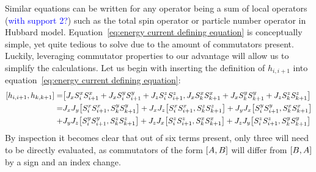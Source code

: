 Similar equations can be written for any operator being a sum of local operators (\textcolor{blue}{with support 2?}) such as
the total spin operator or particle number operator in Hubbard model. Equation~\eqref{eq:energy current defining equation} is
conceptually simple, yet quite tedious to solve due to the amount of commutators present. Luckily, leveraging commutator properties
to our advantage will allow us to simplify the calculations. Let us begin with inserting the definition of \(h_{i,i+1}\) into 
equation~\eqref{eq:energy current defining equation}:
\begin{align*}
    \comm{h_{i,i+1}}{h_{k,k+1}} =& \comm{J_{x} \Sx_{i}\Sx_{i+1} + J_{x} \Sy_{i}\Sy_{i+1} + J_{z} \Sz_{i}\Sz_{i+1}}{J_{x} \Sx_{k}\Sx_{k+1} + J_{x} \Sy_{k}\Sy_{k+1} + J_{z} \Sz_{k}\Sz_{k+1}}\\
    =& J_{x} J_{y}\comm{\Sx_{i}\Sx_{i+1}}{\Sy_{k}\Sy_{k+1}} + J_{x} J_{z}\comm{\Sx_{i}\Sx_{i+1}}{\Sz_{k}\Sz_{k+1}} + J_{y} J_{x}\comm{\Sy_{i}\Sy_{i+1}}{\Sx_{k}\Sx_{k+1}}\\
    +& J_{y} J_{z}\comm{\Sy_{i}\Sy_{i+1}}{\Sz_{k}\Sz_{k+1}} + J_{z} J_{x}\comm{\Sz_{i}\Sz_{i+1}}{\Sx_{k}\Sx_{k+1}} + J_{z} J_{y}\comm{\Sz_{i}\Sz_{i+1}}{\Sy_{k}\Sy_{k+1}}  
\end{align*}
By inspection it becomes clear that out of six terms present, only three will need to be directly evaluated, as commutators of the form
\(\comm{A}{B}\) will differ from \(\comm{B}{A}\) by a sign and an index change.

